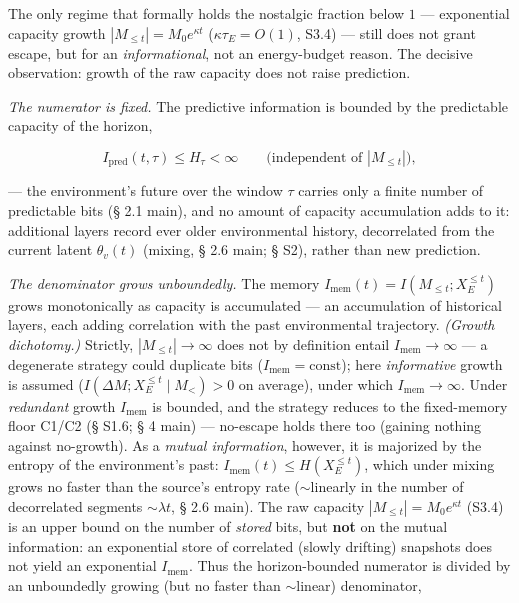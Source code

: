 \documentclass[12pt]{iopart}
\begin{document}
The only regime that formally holds the nostalgic fraction below \(1\) --- exponential capacity growth \(|M_{\le t}| = M_0 e^{\kappa t}\) (\(\kappa\tau_E = O(1)\), S3.4) --- still does not grant escape, but for an \emph{informational}, not an energy-budget reason. The decisive observation: growth of the raw capacity does not raise prediction.



\emph{The numerator is fixed.} The predictive information is bounded by the predictable capacity of the horizon,



\begin{equation}I_{\text{pred}}(t,\tau) \le H_\tau < \infty \qquad\text{(independent of }|M_{\le t}|\text{)}, \tag{S3.5}\end{equation}



--- the environment's future over the window \(\tau\) carries only a finite number of predictable bits (§ 2.1 main), and no amount of capacity accumulation adds to it: additional layers record ever older environmental history, decorrelated from the current latent \(\theta_v(t)\) (mixing, § 2.6 main; § S2), rather than new prediction.



\emph{The denominator grows unboundedly.} The memory \(I_{\text{mem}}(t) = I(M_{\le t}; X_E^{\le t})\) grows monotonically as capacity is accumulated --- an accumulation of historical layers, each adding correlation with the past environmental trajectory. \emph{(Growth dichotomy.)} Strictly, \(|M_{\le t}|\to\infty\) does not by definition entail \(I_{\text{mem}}\to\infty\) --- a degenerate strategy could duplicate bits (\(I_{\text{mem}} = \text{const}\)); here \emph{informative} growth is assumed (\(I(\Delta M; X_E^{\le t}\mid M_{<}) > 0\) on average), under which \(I_{\text{mem}}\to\infty\). Under \emph{redundant} growth \(I_{\text{mem}}\) is bounded, and the strategy reduces to the fixed-memory floor C1/C2 (§ S1.6; § 4 main) --- no-escape holds there too (gaining nothing against no-growth). As a \emph{mutual information}, however, it is majorized by the entropy of the environment's past: \(I_{\text{mem}}(t) \le H(X_E^{\le t})\), which under mixing grows no faster than the source's entropy rate (\(\sim\)linearly in the number of decorrelated segments \(\sim\lambda t\), § 2.6 main). The raw capacity \(|M_{\le t}| = M_0 e^{\kappa t}\) (S3.4) is an upper bound on the number of \emph{stored} bits, but \textbf{not} on the mutual information: an exponential store of correlated (slowly drifting) snapshots does not yield an exponential \(I_{\text{mem}}\). Thus the horizon-bounded numerator is divided by an unboundedly growing (but no faster than \(\sim\)linear) denominator,
\end{document}

